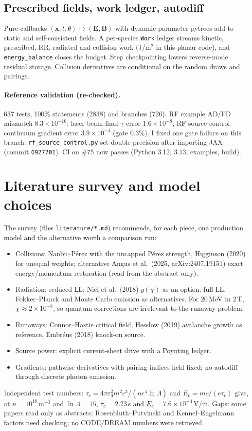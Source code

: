 \documentclass[10pt,a4paper]{article}
\begin{document}
\subsection{Prescribed fields, work ledger, autodiff}
Pure callbacks $(\mathbf x,t,\theta)\mapsto(\mathbf E,\mathbf B)$ with dynamic parameter pytrees add to static
and self-consistent fields. A per-species \texttt{Work} ledger streams kinetic, prescribed, RR, radiated and
collision work (J/m$^2$ in this planar code), and \texttt{energy\_balance} closes the budget. Step
checkpointing lowers reverse-mode residual storage. Collision derivatives are conditional on the random
draws and pairings.

\paragraph{Reference validation (re-checked).} 637 tests, 100\% statements (2838) and branches (726). RF
example AD/FD mismatch $8.3\times10^{-10}$; laser-beam final-$\gamma$ error $1.6\times10^{-8}$; RF
source-control continuum gradient error $3.9\times10^{-4}$ (gate 0.3\%). I fixed one gate failure on this
branch: \texttt{rf\_source\_control.py} set double precision after importing JAX (commit \texttt{0927701}).
CI on \#75 now passes (Python 3.12, 3.13, examples, build).

\section{Literature survey and model choices}
The survey (files \texttt{literature/*.md}) recommends, for each piece, one production model and the
alternative worth a comparison run:
\begin{itemize}
\item Collisions: Nanbu--Pérez with the uncapped Pérez strength, Higginson (2020) for unequal weights;
alternative Angus et al.\ (2025, arXiv:2407.19151) exact energy/momentum restoration (read from the abstract only).
\item Radiation: reduced LL; Niel et al.\ (2018) $g(\chi)$ as an option; full LL, Fokker--Planck and Monte Carlo emission as alternatives.
For 20\,MeV in 2\,T, $\chi\approx2\times10^{-8}$, so quantum corrections are irrelevant to the runaway problem.
\item Runaways: Connor--Hastie critical field, Hesslow (2019) avalanche growth as reference, Embréus (2018) knock-on source.
\item Source power: explicit current-sheet drive with a Poynting ledger.
\item Gradients: pathwise derivatives with pairing indices held fixed; no autodiff through discrete photon emission.
\end{itemize}
Independent test numbers: $\tau_c=4\pi\varepsilon_0^2m^2c^3/(ne^4\ln\Lambda)$ and $E_c=mc/(e\tau_c)$ give, at
$n=10^{18}$\,m$^{-3}$ and $\ln\Lambda=15$, $\tau_c=2.23$\,s and $E_c=7.6\times10^{-4}$\,V/m.
Gaps: some papers read only as abstracts; Rosenbluth--Putvinski and Kennel--Engelmann factors need checking;
no CODE/DREAM numbers were retrieved.
\end{document}
